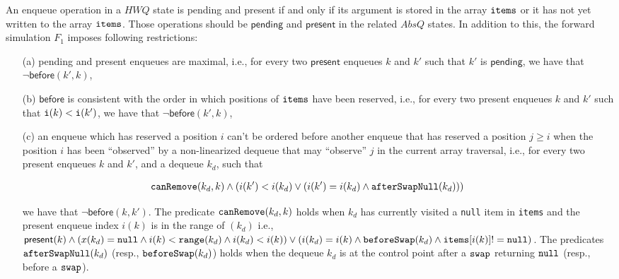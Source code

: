 An enqueue operation in a $\mathit{HWQ}$ state is pending and present if and only if its argument is stored in the array ${\tt items}$ or it has not yet written to the array  ${\tt items}$. Those operations should be $\mathsf{pending}$ and $\mathsf{present}$ in the related $AbsQ$ states. In addition to this, the forward simulation $F_1$ imposes following restrictions:
\vspace{-2mm}
\begin{itemize}
	\item[(a)] pending and present enqueues are maximal, i.e., for every two $\mathsf{present}$ enqueues $k$ and $k'$ such that $k'$ is $\mathsf{pending}$, we have that $\neg \mathsf{before}(k',k)$, %
	\item[(b)] $\mathsf{before}$ is consistent with the order in which positions of ${\tt items}$ have been reserved, i.e., for every two present enqueues $k$ and $k'$ such that ${\tt i}(k) < {\tt i}(k')$, we have that $\neg \mathsf{before}(k',k)$, %
	\item[(c)] an enqueue which has reserved a position $i$ %
	can't be ordered before another enqueue that has reserved a position $j \geq i$ when the position $i$ has been ``observed'' by a non-linearized dequeue that may ``observe'' $j$ in the current array traversal, i.e., for every two present enqueues $k$ and $k'$, and a dequeue $k_d$, such that

	\vspace{-2mm}
	\noindent
	{\small
	\begin{align}
	\hspace{-8mm}
	{\tt canRemove}(k_d,k) \land (i(k') < i(k_d) \lor (i(k')=i(k_d) \land {\tt afterSwapNull}(k_d)))
\label{eq:inst}
	\end{align}}

	\vspace{-6mm}
	\noindent
	we have that $\neg \mathsf{before}(k,k')$. The predicate ${\tt canRemove}(k_d,k)$ holds when $k_d$ has currently visited a {\tt null} item in {\tt items} and the present enqueue index $i(k)$ is in the range of $(k_d)$ i.e., $\mathsf{present}(k) \land (x(k_d) = {\tt null} \land i(k) < {\tt range}(k_d) \land i(k_d) < i(k)) \lor (i(k_d) = i(k) \land {\tt beforeSwap}(k_d) \land {\tt items}[i(k)] != {\tt null})$. The predicates ${\tt afterSwapNull}(k_d)$ (resp., ${\tt beforeSwap}(k_d)$) holds when the dequeue $k_d$ is at the control point after a ${\tt swap}$ returning ${\tt null}$ (resp., before a ${\tt swap}$).
\vspace{-2mm}
\end{itemize}

